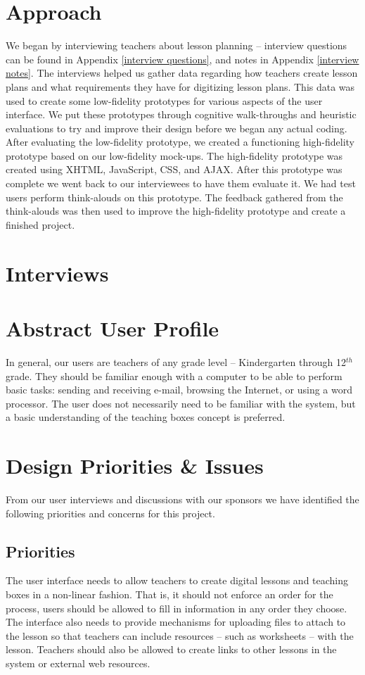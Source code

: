 \documentclass[10pt,letter]{article}
\begin{document}
\section{Approach}
We began by interviewing teachers about lesson planning -- interview questions
can be found in Appendix \ref{interview questions}, and notes in Appendix
\ref{interview notes}. The interviews helped us gather data regarding how
teachers create lesson plans and what requirements they have for digitizing
lesson plans. This data was used to create some low-fidelity prototypes for
various aspects of the user interface. We put these prototypes through cognitive
walk-throughs and heuristic evaluations to try and improve their design before
we began any actual coding. After evaluating the low-fidelity prototype, we
created a functioning high-fidelity prototype based on our low-fidelity
mock-ups. The high-fidelity prototype was created using XHTML, JavaScript, CSS,
and AJAX. After this prototype was complete we went back to our interviewees to
have them evaluate it. We had test users perform think-alouds on this prototype.
The feedback gathered from the think-alouds was then used to improve the
high-fidelity prototype and create a finished project.

\section{Interviews}


\section{Abstract User Profile}
In general, our users are teachers of any grade level -- Kindergarten through
12$^{th}$ grade. They should be familiar enough with a computer to be able to
perform basic tasks: sending and receiving e-mail, browsing the Internet, or
using a word processor. The user does not necessarily need to be familiar with
the system, but a basic understanding of the teaching boxes concept is
preferred.

\section{Design Priorities \& Issues}
From our user interviews and discussions with our sponsors we have identified
the following priorities and concerns for this project.

\subsection{Priorities}
The user interface needs to allow teachers to create digital lessons and
teaching boxes in a non-linear fashion. That is, it should not enforce an order
for the process, users should be allowed to fill in information in any order
they choose. The interface also needs to provide mechanisms for uploading files
to attach to the lesson so that teachers can include resources -- such as
worksheets -- with the lesson. Teachers should also be allowed to create links
to other lessons in the system or external web resources.
\end{document}
